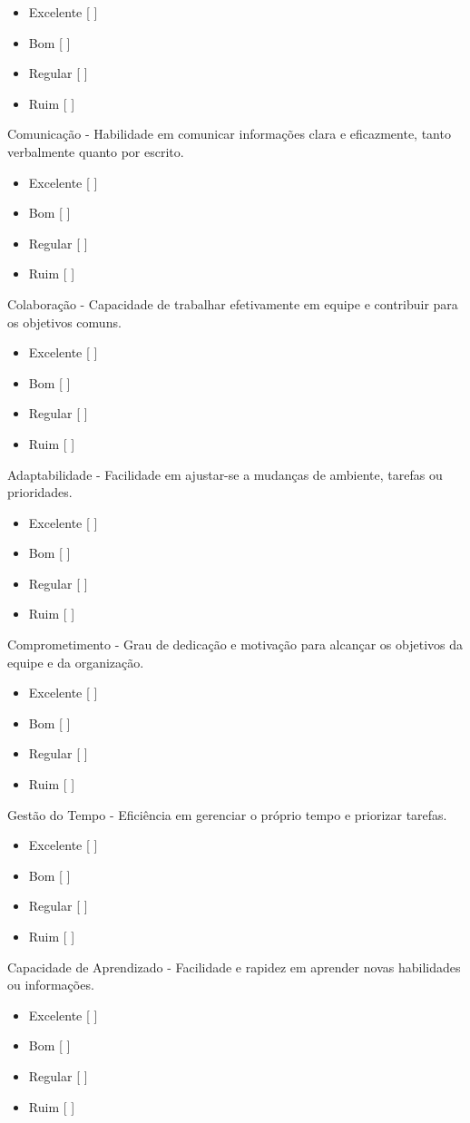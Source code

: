 \documentclass[8pt]{article}
\begin{document}
\begin{multicols}{2}
    \begin{itemize}
        \item Excelente [ ]
        \item Bom       [ ]
        \item Regular   [ ]
        \item Ruim      [ ]
    \end{itemize}
Comunicação - Habilidade em comunicar informações clara e eficazmente, tanto verbalmente quanto por escrito.
    \begin{itemize}
        \item Excelente [ ]
        \item Bom       [ ]
        \item Regular   [ ]
        \item Ruim      [ ]
    \end{itemize}
\columnbreak
Colaboração - Capacidade de trabalhar efetivamente em equipe e contribuir para os objetivos comuns.
    \begin{itemize}
        \item Excelente [ ]
        \item Bom       [ ]
        \item Regular   [ ]
        \item Ruim      [ ]
    \end{itemize}
Adaptabilidade - Facilidade em ajustar-se a mudanças de ambiente, tarefas ou prioridades.
    \begin{itemize}
        \item Excelente [ ]
        \item Bom       [ ]
        \item Regular   [ ]
        \item Ruim      [ ]
    \end{itemize}
Comprometimento - Grau de dedicação e motivação para alcançar os objetivos da equipe e da organização.
    \begin{itemize}
        \item Excelente [ ]
        \item Bom       [ ]
        \item Regular   [ ]
        \item Ruim      [ ]
    \end{itemize}
Gestão do Tempo - Eficiência em gerenciar o próprio tempo e priorizar tarefas.
    \begin{itemize}
        \item Excelente [ ]
        \item Bom       [ ]
        \item Regular   [ ]
        \item Ruim      [ ]
    \end{itemize}
Capacidade de Aprendizado - Facilidade e rapidez em aprender novas habilidades ou informações.
    \begin{itemize}
        \item Excelente [ ]
        \item Bom       [ ]
        \item Regular   [ ]
        \item Ruim      [ ]
    \end{itemize}


\end{multicols}
\end{document}
